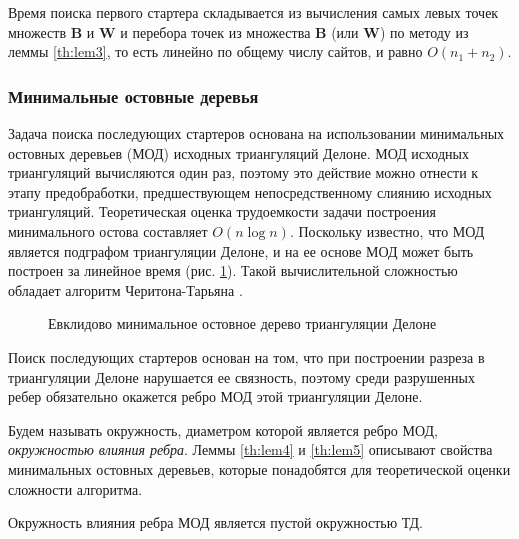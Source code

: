 \documentclass[12pt]{article}
\begin{document}
Время поиска первого стартера складывается из вычисления самых левых точек множеств $\textbf{B}$ и $\textbf{W}$ и
перебора точек из множества $\textbf{B}$ (или $\textbf{W}$) по методу из леммы \ref{th:lem3},
то есть линейно по общему числу сайтов, и равно $O(n_1 + n_2)$.

\subsubsection{Минимальные остовные деревья}
Задача поиска последующих стартеров основана на использовании минимальных остовных деревьев (МОД) исходных триангуляций Делоне.
МОД исходных триангуляций вычисляются один раз, поэтому это действие можно отнести к этапу предобработки, предшествующем непосредственному слиянию исходных триангуляций.
Теоретическая оценка трудоемкости задачи построения минимального остова составляет $O(n\log n)$.
Поскольку известно, что МОД является подграфом триангуляции Делоне, и на ее основе МОД может быть построен за линейное время (рис. \ref{pic:mst}).
Такой вычислительной сложностью обладает алгоритм Черитона-Тарьяна \cite[стр. 226-230]{Preparata}.

\begin{figure}[htb!]
	\caption{Евклидово минимальное остовное дерево триангуляции Делоне}
	\label{pic:mst}
\end{figure}

Поиск последующих стартеров основан на том, что при построении разреза в триангуляции Делоне нарушается ее связность,
поэтому среди разрушенных ребер обязательно окажется ребро МОД этой триангуляции Делоне.

Будем называть окружность, диаметром которой является ребро МОД, {\itshape окружностью влияния ребра}.
Леммы \ref{th:lem4} и \ref{th:lem5} описывают свойства минимальных остовных деревьев,
которые понадобятся для теоретической оценки сложности алгоритма.

\begin{lemma}
\label{th:lem4}
Окружность влияния ребра МОД является пустой окружностью ТД.
\end{lemma}
\end{document}
